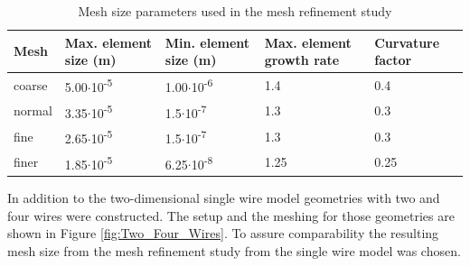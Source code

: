  
\begin{table}[H]
\centering
\caption[Mesh size parameters]{Mesh size parameters used in the mesh refinement study}
\label{table:Mesh_Ref}
\begin{tabularx}{\textwidth}{XXXXX}\hline
Mesh &  Max. element size (m) & Min. element size (m) & Max. element growth rate & Curvature \newline factor \\
\hline\hline
coarse &  5.00$\cdotp$10\textsuperscript{-5} & 1.00$\cdotp$10\textsuperscript{-6} & 1.4 & 0.4 \\
normal &  3.35$\cdotp$10\textsuperscript{-5} & 1.5$\cdotp$10\textsuperscript{-7} & 1.3 & 0.3 \\
fine &  2.65$\cdotp$10\textsuperscript{-5} & 1.5$\cdotp$10\textsuperscript{-7} & 1.3 & 0.3 \\
finer &  1.85$\cdotp$10\textsuperscript{-5} & 6.25$\cdotp$10\textsuperscript{-8} & 1.25 & 0.25 \\
\hline
\end{tabularx}
\end{table}

In addition to the two-dimensional single wire model geometries with two and four wires were constructed. The setup and the meshing for those geometries are shown in Figure \ref{fig:Two_Four_Wires}. To assure comparability the resulting mesh size from the mesh refinement study from the single wire model was chosen.  

